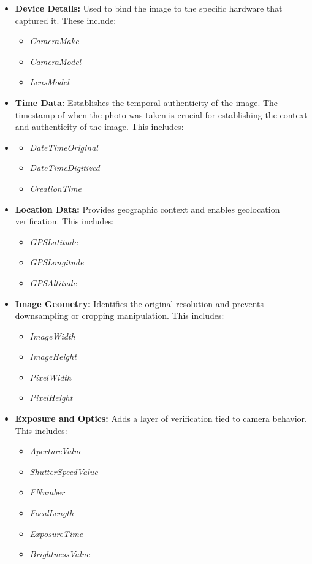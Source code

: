 \begin{itemize}
    \item {\textbf{Device Details:}} Used to bind the image to the specific hardware that captured it. These include:
    \begin{itemize}
        \item \textit{CameraMake}
        \item \textit{CameraModel}
        \item \textit{LensModel}
    \end{itemize}

    \item {\textbf{Time Data:}} Establishes the temporal authenticity of the image. The timestamp of when the photo was taken is crucial for establishing the context and authenticity of the image. This includes:
    \item \begin{itemize}
        \item \textit{DateTimeOriginal}
        \item \textit{DateTimeDigitized}
        \item \textit{CreationTime}
    \end{itemize}

    \item {\textbf{Location Data:}} Provides geographic context and enables geolocation verification. This includes:
    \begin{itemize}
        \item \textit{GPSLatitude}
        \item \textit{GPSLongitude}
        \item \textit{GPSAltitude}
    \end{itemize}

    \item {\textbf{Image Geometry:}} Identifies the original resolution and prevents downsampling or cropping manipulation. This includes:
    \begin{itemize}
        \item \textit{ImageWidth}
        \item \textit{ImageHeight}
        \item \textit{PixelWidth}
        \item \textit{PixelHeight}
    \end{itemize}

    \item {\textbf{Exposure and Optics:}} Adds a layer of verification tied to camera behavior. This includes:
    \begin{itemize}
        \item \textit{ApertureValue}
        \item \textit{ShutterSpeedValue}
        \item \textit{FNumber}
        \item \textit{FocalLength}
        \item \textit{ExposureTime}
        \item \textit{BrightnessValue}
    \end{itemize}


\end{itemize}
